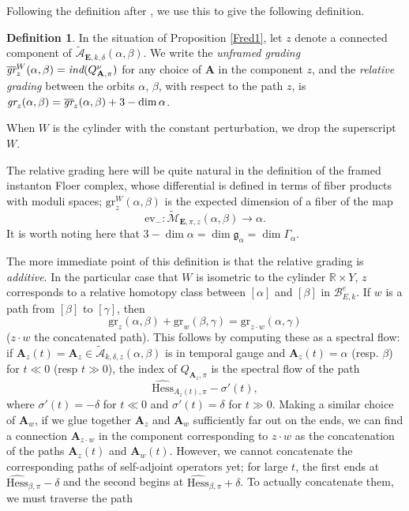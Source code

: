 \documentclass[10pt,a4paper]{amsart}
\theoremstyle{definition}
\newtheorem{definition}[theorem]{Definition}
\theoremstyle{remark}
\numberwithin{figure}{qchap}
\begin{document}
Following the definition after \cite[Lemma~3.13]{KM1}, we use this to give the following definition.

\begin{definition}\label{grading}In the situation of Proposition \ref{Fred1}, let $z$ denote 
a connected component of $\widetilde{\mathcal A}_{\mathbf{E},k, \delta}(\alpha, \beta)$. We write the \textit{unframed grading} $\overline{\text{\em{gr}}}^W_z(\alpha, \beta) = \text{\em{ind}}(Q^\nu_{\mathbf{A},\pi})$ for any choice of $\mathbf{A}$ in the component $z$, and the \textit{relative grading} between the orbits $\alpha$, $\beta$, with respect to the path $z$, is $\text{\em{gr}}_z(\alpha, \beta) = \overline{\text{\em{gr}}}_z(\alpha, \beta) + 3 - \dim \alpha$.

When $W$ is the cylinder with the constant perturbation, we drop the superscript $W$.
\end{definition}

The relative grading here will be quite natural in the definition of the framed instanton Floer complex, whose differential is defined in terms of fiber products with moduli spaces; $\text{gr}^W_z(\alpha, \beta)$ is the expected dimension of a fiber of the map $$\text{ev}_-: \widetilde{\mathcal M}_{\mathbf{E},\pi,z}(\alpha, \beta) \to \alpha.$$ It is worth noting here that $3 - \dim \alpha = \dim \mathfrak g_{\alpha} = \dim \Gamma_{\alpha}$.

The more immediate point of this definition is that the relative grading is \textit{additive}. In the particular case that $W$ is isometric to the cylinder $\mathbb R \times Y$, $z$ corresponds to a relative homotopy class between $[\alpha]$ and $[\beta]$ in $\mathcal B^e_{E,k}$. If $w$ is a path from $[\beta]$ to $[\gamma]$, then $$\text{gr}_z(\alpha, \beta) + \text{gr}_w(\beta, \gamma) = \text{gr}_{z \cdot w}(\alpha, \gamma)$$ ($z \cdot w$ the concatenated path). This follows by computing these as a spectral flow: if $\mathbf{A}_z(t) = \mathbf{A}_z \in \widetilde{\mathcal A}_{k, \delta,z}(\alpha, \beta)$ is in temporal gauge and $\mathbf{A}_z(t) = \alpha$ (resp. $\beta$) for $t \ll 0$ (resp $t \gg 0$), the index of $Q_{\mathbf{A}_z,\pi}$ is the spectral flow of the path
$$\widehat{\text{Hess}}_{A_z(t),\pi} - \sigma'(t),$$ 
where $\sigma'(t) = - \delta$ for $t \ll 0$ and $\sigma'(t) = \delta$ for $t \gg 0$. Making a similar choice of $\mathbf{A}_w$, if we glue together $\mathbf{A}_z$ and $\mathbf{A}_w$ sufficiently far out on the ends, we can find a connection $\mathbf{A}_{z \cdot w}$ in the component corresponding to $z \cdot w$ as the concatenation of the paths $\mathbf{A}_z(t)$ and $\mathbf{A}_w(t)$. However, we cannot concatenate the corresponding paths of self-adjoint operators yet; for large $t$, the first ends at $\widehat{\text{Hess}}_{\beta,\pi} - \delta$ and the second begins at $\widehat{\text{Hess}}_{\beta,\pi} + \delta$. To actually concatenate them, we must traverse the path
\end{document}
